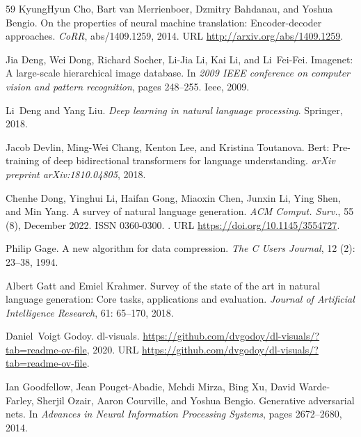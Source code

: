 \begin{thebibliography}{59}
KyungHyun Cho, Bart van Merrienboer, Dzmitry Bahdanau, and Yoshua Bengio.
\newblock On the properties of neural machine translation: Encoder-decoder approaches.
\newblock \emph{CoRR}, abs/1409.1259, 2014.
\newblock URL \url{http://arxiv.org/abs/1409.1259}.

Jia Deng, Wei Dong, Richard Socher, Li-Jia Li, Kai Li, and Li~Fei-Fei.
\newblock Imagenet: A large-scale hierarchical image database.
\newblock In \emph{2009 IEEE conference on computer vision and pattern recognition}, pages 248--255. Ieee, 2009.

Li~Deng and Yang Liu.
\newblock \emph{Deep learning in natural language processing}.
\newblock Springer, 2018.

Jacob Devlin, Ming-Wei Chang, Kenton Lee, and Kristina Toutanova.
\newblock Bert: Pre-training of deep bidirectional transformers for language understanding.
\newblock \emph{arXiv preprint arXiv:1810.04805}, 2018.

Chenhe Dong, Yinghui Li, Haifan Gong, Miaoxin Chen, Junxin Li, Ying Shen, and Min Yang.
\newblock A survey of natural language generation.
\newblock \emph{ACM Comput. Surv.}, 55 (8), December 2022.
\newblock ISSN 0360-0300.
\newblock {}.
\newblock URL \url{https://doi.org/10.1145/3554727}.

Philip Gage.
\newblock A new algorithm for data compression.
\newblock \emph{The C Users Journal}, 12 (2): 23--38, 1994.

Albert Gatt and Emiel Krahmer.
\newblock Survey of the state of the art in natural language generation: Core tasks, applications and evaluation.
\newblock \emph{Journal of Artificial Intelligence Research}, 61: 65--170, 2018.

Daniel~Voigt Godoy.
\newblock dl-visuals.
\newblock \url{https://github.com/dvgodoy/dl-visuals/?tab=readme-ov-file}, 2020.
\newblock URL \url{https://github.com/dvgodoy/dl-visuals/?tab=readme-ov-file}.

Ian Goodfellow, Jean Pouget-Abadie, Mehdi Mirza, Bing Xu, David Warde-Farley, Sherjil Ozair, Aaron Courville, and Yoshua Bengio.
\newblock Generative adversarial nets.
\newblock In \emph{Advances in Neural Information Processing Systems}, pages 2672--2680, 2014.


\end{thebibliography}
